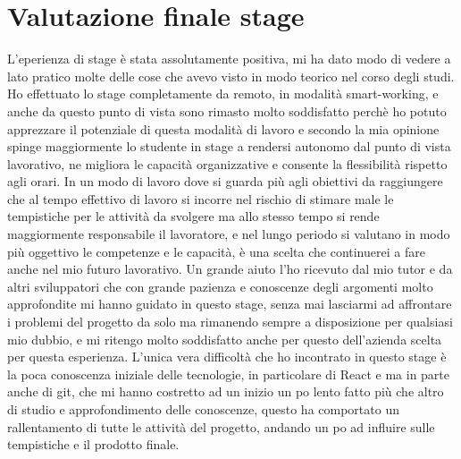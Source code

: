 \section{Valutazione finale stage}
\label{sec:valutazione-finale-stage}
L'eperienza di stage è stata assolutamente positiva, mi ha dato modo di vedere a lato pratico molte delle cose che avevo visto in modo teorico nel corso degli studi. Ho effettuato lo
stage completamente da remoto, in modalità smart-working, e anche da questo punto di vista sono rimasto molto soddisfatto perchè ho potuto apprezzare il potenziale di questa modalità di
lavoro e secondo la mia opinione spinge maggiormente lo studente in stage a rendersi autonomo dal punto di vista lavorativo, ne migliora le capacità organizzative e consente la flessibilità
rispetto agli orari. In un modo di lavoro dove si guarda più agli obiettivi da raggiungere che al tempo effettivo di lavoro si incorre nel rischio di stimare male le tempistiche per le
attività da svolgere ma allo stesso tempo si rende maggiormente responsabile il lavoratore, e nel lungo periodo si valutano in modo più oggettivo le competenze e le capacità, è una
scelta che continuerei a fare anche nel mio futuro lavorativo. Un grande aiuto l'ho ricevuto dal mio tutor e da altri sviluppatori che con grande pazienza e conoscenze degli
argomenti molto approfondite mi hanno guidato in questo stage, senza mai lasciarmi ad affrontare i problemi del progetto da solo ma rimanendo sempre a disposizione per qualsiasi mio dubbio,
e mi ritengo molto soddisfatto anche per questo dell'azienda scelta per questa esperienza. L'unica vera difficoltà che ho incontrato in questo stage è la poca conoscenza iniziale delle
tecnologie, in particolare di React e ma in parte anche di git, che mi hanno costretto ad un inizio un po lento fatto più che altro di studio e approfondimento delle conoscenze, questo ha
comportato un rallentamento di tutte le attività del progetto, andando un po ad influire sulle tempistiche e il prodotto finale.